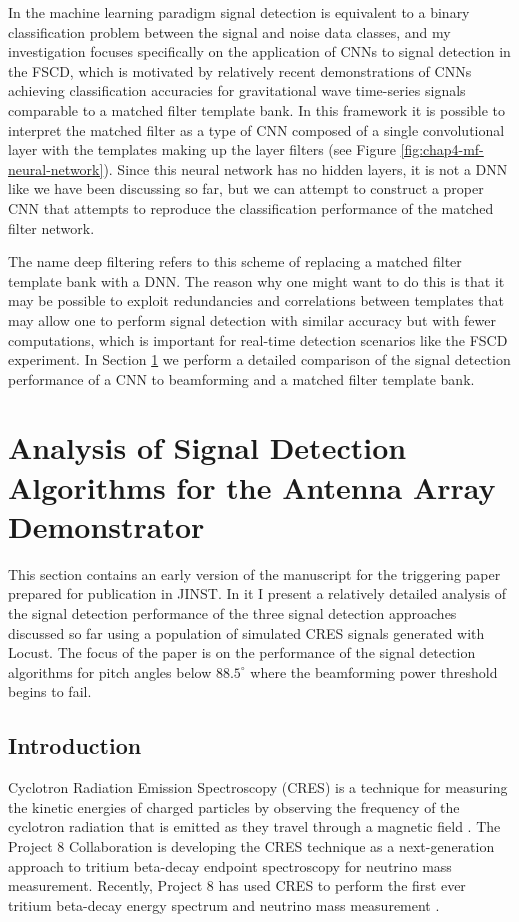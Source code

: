 In the machine learning paradigm signal detection is equivalent to a binary classification problem between the signal and noise data classes, and my investigation focuses specifically on the application of CNNs to signal detection in the FSCD, which is motivated by relatively recent demonstrations of CNNs achieving classification accuracies for gravitational wave time-series signals comparable to a matched filter template bank. In this framework it is possible to interpret the matched filter as a type of CNN composed of a single convolutional layer with the templates making up the layer filters (see Figure \ref{fig:chap4-mf-neural-network}). Since this neural network has no hidden layers, it is not a DNN like we have been discussing so far, but we can attempt to construct a proper CNN that attempts to reproduce the classification performance of the matched filter network.

The name deep filtering refers to this scheme of replacing a matched filter template bank with a DNN. The reason why one might want to do this is that it may be possible to exploit redundancies and correlations between templates that may allow one to perform signal detection with similar accuracy but with fewer computations, which is important for real-time detection scenarios like the FSCD experiment. In Section \ref{sec:chap4-trigger-paper} we perform a detailed comparison of the signal detection performance of a CNN to beamforming and a matched filter template bank.

\section{Analysis of Signal Detection Algorithms for the Antenna Array Demonstrator}
\label{sec:chap4-trigger-paper}
This section contains an early version of the manuscript for the triggering paper prepared for publication in JINST. In it I present a relatively detailed analysis of the signal detection performance of the three signal detection approaches discussed so far using a population of simulated CRES signals generated with Locust. The focus of the paper is on the performance of the signal detection algorithms for pitch angles below $88.5^\circ$ where the beamforming power threshold begins to fail.

\subsection{Introduction}
Cyclotron Radiation Emission Spectroscopy (CRES) is a technique for measuring the kinetic energies of charged particles by observing the frequency of the cyclotron radiation that is emitted as they travel through a magnetic field \cite{p8originalcres}.
The Project 8 Collaboration is developing the CRES technique as a next-generation approach to tritium beta-decay endpoint spectroscopy for neutrino mass measurement. Recently, Project 8 has used CRES to perform the first ever tritium beta-decay energy spectrum and neutrino mass measurement \cite{p8prl2023, p8prc2023}.

